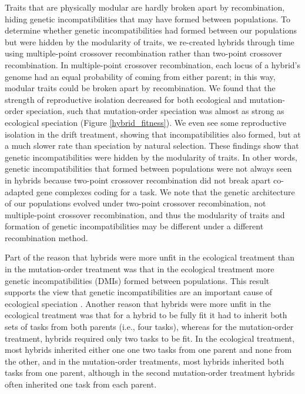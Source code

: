 \begin{doublespace}
Traits that are physically modular
are hardly broken apart by recombination,
hiding genetic incompatibilities
that may have formed between populations.
%
To determine whether genetic incompatibilities
had formed between our populations
but were hidden by the modularity of traits,
we re-created hybrids through time using multiple-point crossover recombination
rather than two-point crossover recombination.
%
In multiple-point crossover recombination,
each locus of a hybrid's genome had an equal probability
of coming from either parent;
in this way, modular traits could be broken apart by recombination.
%
We found that the strength of reproductive isolation
decreased for both ecological and mutation-order speciation,
such that mutation-order speciation
was almost as strong as ecological speciation (Figure \ref{hybrid_fitness}).
%
We even see some reproductive isolation in the drift treatment,
showing that incompatibilities also formed,
but at a much slower rate than speciation by natural selection.
%
These findings show that genetic incompatibilities
were hidden by the modularity of traits.
%
In other words, genetic incompatibilities that formed between populations
were not always seen in hybrids because two-point crossover recombination
did not break apart co-adapted gene complexes coding for a task.
%
We note that the genetic architecture of our populations
evolved under two-point crossover recombination,
not multiple-point crossover recombination,
and thus the modularity of traits
and formation of genetic incompatibilities
may be different under a different recombination method.



Part of the reason that hybrids were more unfit in the ecological treatment
than in the mutation-order treatment was that in the ecological treatment
more genetic incompatibilities (DMIs) formed between populations.
%
This result supports the view that genetic incompatibilities
are an important cause of ecological speciation \citep{run05}.
%
Another reason that hybrids were more unfit in the ecological treatment was
that for a hybrid to be fully fit it had to inherit both sets of tasks from
both parents (i.e., four tasks), whereas for the mutation-order treatment,
hybrids required only two tasks to be fit.
%
In the ecological treatment, most hybrids inherited either one one two tasks
from one parent and none from the other, and in the mutation-order treatments,
most hybrids inherited both tasks from one parent, although in the second
mutation-order treatment hybrids often inherited one task from each parent.




\end{doublespace}
